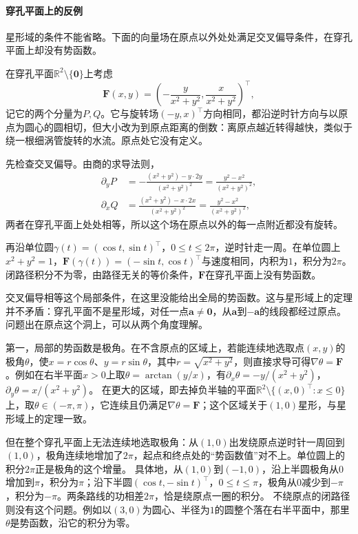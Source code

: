 \paragraph{穿孔平面上的反例}

星形域的条件不能省略。下面的向量场在原点以外处处满足交叉偏导条件，在穿孔平面上却没有势函数。
\begin{example}[穿孔平面上的涡旋场]
\label{ex:analysis-punctured-plane-vortex}
在穿孔平面$\mathbb R^2\setminus\{\bm0\}$上考虑
\[
 \bm F(x,y)=\left(-\frac{y}{x^2+y^2},\frac{x}{x^2+y^2}\right)^\top ,
\]
记它的两个分量为$P,Q$。它与旋转场$(-y,x)^\top$方向相同，都沿逆时针方向与以原点为圆心的圆相切，但大小改为到原点距离的倒数：离原点越近转得越快，类似于绕一根细涡管旋转的水流。原点处它没有定义。

先检查交叉偏导。由商的求导法则，
\[
 \begin{aligned}
 \partial_yP&=-\frac{(x^2+y^2)-y\cdot2y}{(x^2+y^2)^2}=\frac{y^2-x^2}{(x^2+y^2)^2},\\
 \partial_xQ&=\frac{(x^2+y^2)-x\cdot2x}{(x^2+y^2)^2}=\frac{y^2-x^2}{(x^2+y^2)^2},
 \end{aligned}
\]
两者在穿孔平面上处处相等，所以这个场在原点以外的每一点附近都没有旋转。

再沿单位圆$\gamma(t)=(\cos t,\sin t)^\top$，$0\leq t\leq2\pi$，逆时针走一周。在单位圆上$x^2+y^2=1$，$\bm F(\gamma(t))=(-\sin t,\cos t)^\top$与速度相同，内积为$1$，积分为$2\pi$。
闭路径积分不为零，由路径无关的等价条件，$\bm F$在穿孔平面上没有势函数。
\end{example}

交叉偏导相等这个局部条件，在这里没能给出全局的势函数。这与星形域上的定理并不矛盾：穿孔平面不是星形域，对任一点$\bm a\neq\bm0$，从$\bm a$到$-\bm a$的线段都经过原点。问题出在原点这个洞上，可以从两个角度理解。

第一，局部的势函数是极角。在不含原点的区域上，若能连续地选取点$(x,y)$的极角$\theta$，使$x=r\cos\theta$、$y=r\sin\theta$，其中$r=\sqrt{x^2+y^2}$，则直接求导可得$\nabla\theta=\bm F$。例如在右半平面$x>0$上取$\theta=\arctan(y/x)$，有$\partial_x\theta=-y/(x^2+y^2)$，$\partial_y\theta=x/(x^2+y^2)$。
在更大的区域，即去掉负半轴的平面$\mathbb R^2\setminus\{(x,0)^\top:x\leq0\}$上，取$\theta\in(-\pi,\pi)$，它连续且仍满足$\nabla\theta=\bm F$；这个区域关于$(1,0)$星形，与星形域上的定理一致。

但在整个穿孔平面上无法连续地选取极角：从$(1,0)$出发绕原点逆时针一周回到$(1,0)$，极角连续地增加了$2\pi$，起点和终点处的“势函数值”对不上。单位圆上的积分$2\pi$正是极角的这个增量。
具体地，从$(1,0)$到$(-1,0)$，沿上半圆极角从$0$增加到$\pi$，积分为$\pi$；沿下半圆$(\cos t,-\sin t)^\top$，$0\leq t\leq\pi$，极角从$0$减少到$-\pi$，积分为$-\pi$。两条路线的功相差$2\pi$，恰是绕原点一圈的积分。
不绕原点的闭路径则没有这个问题。例如以$(3,0)$为圆心、半径为$1$的圆整个落在右半平面中，那里$\theta$是势函数，沿它的积分为零。

